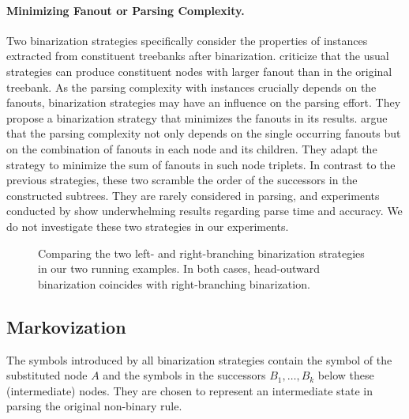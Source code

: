 \documentclass[../../document.tex]{subfiles}
\begin{document}
    \paragraph{Minimizing Fanout or Parsing Complexity.}
    Two binarization strategies specifically consider the properties of  instances extracted from constituent treebanks after binarization.
    \citet{gomez2009optimal} criticize that the usual strategies can produce constituent nodes with larger fanout than in the original treebank.
    As the parsing complexity with  instances crucially depends on the fanouts, binarization strategies may have an influence on the parsing effort.
    They propose a binarization strategy that minimizes the fanouts in its results.
    \citet{Gil10} argue that the parsing complexity not only depends on the single occurring fanouts but on the combination of fanouts in each node and its children.
    They adapt the strategy to minimize the sum of fanouts in such node triplets.
    In contrast to the previous strategies, these two scramble the order of the successors in the constructed subtrees.
    They are rarely considered in parsing, and experiments conducted by \citet{Cra12} show underwhelming results regarding parse time and accuracy.
    We do not investigate these two strategies in our experiments.

    \begin{figure}
        \resizebox{.3\linewidth}{!}{}\hfill
        \resizebox{.3\linewidth}{!}{}\hfill
        \resizebox{.3\linewidth}{!}{}

        \vspace{.5cm}

        \resizebox{.3\linewidth}{!}{}\hfill
        \resizebox{.3\linewidth}{!}{}\hfill
        \resizebox{.3\linewidth}{!}{}

        \caption{\label{fig:ex:binarization}
            Comparing the two left- and right-branching binarization strategies in our two running examples.
            In both cases, head-outward binarization coincides with right-branching binarization.
        }
    \end{figure}


    \subsection{Markovization}
    The symbols introduced by all binarization strategies contain the symbol of the substituted node \(A\) and the symbols in the successors \(B_1, \ldots, B_k\) below these (intermediate) nodes.
    They are chosen to represent an intermediate state in parsing the original non-binary rule.
\end{document}
